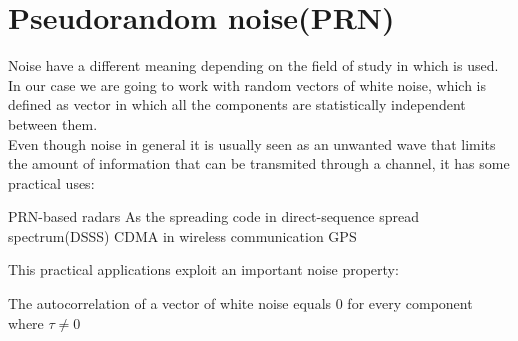 \section{Pseudorandom noise(PRN)}

Noise have a different meaning depending on the field of study in which is
used. In our case we are going to work with random vectors of white noise,
which is defined as vector in which all the components are statistically
independent between them.\cite{white_noise}\\

Even though noise in general it is usually seen as an unwanted wave that
limits the amount of information that can be transmited through a
channel\cite{shannon_noise}, it has some practical uses:


\begin{outline}
  \1 PRN-based radars\cite{prn_radar_example1}
  \1 As the spreading code in direct-sequence spread spectrum(DSSS) \cite{DSSS_1}\cite{DSSS}
    \2 CDMA in wireless communication\cite{DSSS}
    \2 GPS\cite{GPS}
\end{outline}

This practical applications exploit an important noise property:

\begin{theorem}
  The autocorrelation of a vector of white noise equals 0 for every component
  where $\tau \neq 0$ \cite{everett}
\end{theorem}
